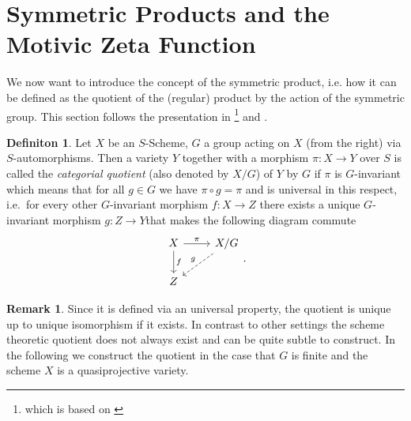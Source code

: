 \documentclass[11pt, a4paper, german]{article}
\theoremstyle{plain}
\theoremstyle{definition}
\newtheorem{definition}[theorem]{Definiton}
\newtheorem{remark}[theorem]{Remark}
\begin{document}

\section{Symmetric Products and the Motivic Zeta Function}
\label{symProd}
We now want to introduce the concept of the symmetric product, i.e. how it can be defined as the quotient of the (regular) product by the
action of the symmetric group. This section follows the presentation in \cite[Appendix A]{mustata}
\footnote{which is based on \cite[§7]{MumAV}} and \cite[Lecture 10]{harris}.
\begin{definition}
    Let $X$ be an $S$-Scheme, $G$ a group acting on $X$ (from the right) 
    via $S$-automorphisms. Then a variety $Y$ together with a morphism $\pi \colon X \to Y$
    over $S$ is called the 
    \emph{categorial quotient} (also denoted by $X/G$) of $Y$ by $G$ if $\pi$ is $G$-invariant which means that for all $g \in G$ we have
    $\pi \circ g = \pi$ and is universal in this respect, i.e.\ for every other $G$-invariant morphism $f \colon X \to Z$ there exists a unique
    $G$-invariant morphism $g \colon Z \to Y$that makes the following diagram commute
    \begin{equation*}
        \begin{tikzcd}
            X \arrow{r}{\pi} \arrow{d}{f} & X/G \\
            Z \arrow[dashleftarrow]{ur}{g}
        \end{tikzcd}.
    \end{equation*}
\end{definition}

\begin{remark}
    Since it is defined via an universal property, the quotient is unique up to unique isomorphism if it exists. 
    In contrast to other settings the scheme theoretic quotient does not always exist and can be quite subtle to construct.
    In the following we construct the quotient in the case that $G$ is finite and the scheme $X$ is a quasiprojective variety.
\end{remark}
\end{document}
